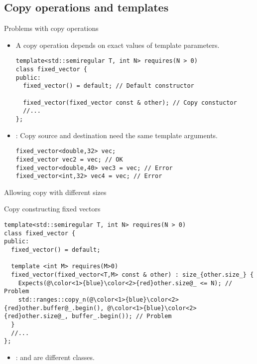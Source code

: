 \subsection{Copy operations and templates}

\begin{frame}[t,fragile]{Problems with copy operations}
\begin{itemize}
  \item A copy operation depends on exact values of template parameters.
\begin{lstlisting}
template<std::semiregular T, int N> requires(N > 0)
class fixed_vector {
public:
  fixed_vector() = default; // Default constructor

  fixed_vector(fixed_vector const & other); // Copy constuctor
  //...
};
\end{lstlisting}

  \item {}: Copy source and destination need 
        the same template arguments.
\begin{lstlisting}
fixed_vector<double,32> vec;
fixed_vector vec2 = vec; // OK
fixed_vector<double,40> vec3 = vec; // Error
fixed_vector<int,32> vec4 = vec; // Error
\end{lstlisting}

\end{itemize}
\end{frame}

\begin{frame}[t,fragile]{Allowing copy with different sizes}
\begin{block}{Copy constructing fixed vectors}
\begin{lstlisting}[escapechar=@]
template<std::semiregular T, int N> requires(N > 0)
class fixed_vector {
public:
  fixed_vector() = default;

  template <int M> requires(M>0)
  fixed_vector(fixed_vector<T,M> const & other) : size_{other.size_} {
    Expects(@\color<1>{blue}\color<2>{red}other.size@_ <= N); // Problem
    std::ranges::copy_n(@\color<1>{blue}\color<2>{red}other.buffer@_.begin(), @\color<1>{blue}\color<2>{red}other.size@_, buffer_.begin()); // Problem
  }
  //...
};
\end{lstlisting}
\end{block}
\begin{itemize}
  \item<2> :  and  are different classes.
\end{itemize}
\end{frame}


